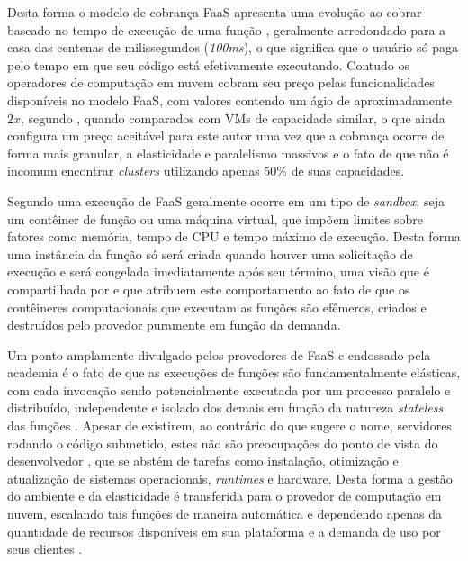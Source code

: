 \documentclass[english,brazilian]{UNISINOSmonografia} %
\begin{document}
Desta forma o modelo de cobrança FaaS apresenta uma evolução  ao cobrar baseado no tempo de execução de uma função \cite{FowlerServerless, Wang2018}, geralmente arredondado para a casa das centenas de milissegundos (\textit{100ms}), o que significa que o usuário só paga pelo tempo em que seu código está efetivamente executando.
Contudo os operadores de computação em nuvem cobram seu preço pelas funcionalidades disponíveis no modelo FaaS, com valores contendo um ágio de aproximadamente $2x$, segundo , quando comparados com VMs de capacidade similar, o que ainda configura um preço aceitável para este autor uma vez que a cobrança ocorre de forma mais granular, a elasticidade e paralelismo massivos e o fato de que não é incomum encontrar \textit{clusters} utilizando apenas 50\% de suas capacidades.



Segundo  uma execução de FaaS geralmente ocorre em um tipo de \textit{sandbox}, seja um contêiner de função ou uma máquina virtual, que impõem limites sobre fatores como memória, tempo de CPU e tempo máximo de execução.
Desta forma uma instância da função só será criada quando houver uma solicitação de execução e será congelada imediatamente após seu término, uma visão que é compartilhada por  e que atribuem este comportamento ao fato de que os contêineres computacionais que executam as funções são efêmeros, criados e destruídos pelo provedor puramente em função da demanda.



Um ponto amplamente divulgado pelos provedores de FaaS e endossado pela academia é o fato de que as execuções de funções são fundamentalmente elásticas, com cada invocação sendo potencialmente executada por um processo paralelo e distribuído, independente e isolado dos demais em função da natureza \textit{stateless} das funções \cite{SpoialaServerless,Jonas2017,FowlerServerless,Jonas2017}.
Apesar de existirem, ao contrário do que sugere o nome, servidores rodando o código submetido, estes não são preocupações do ponto de vista do desenvolvedor \cite{SpoialaServerless}, que se abstém de tarefas como instalação, otimização e atualização de sistemas operacionais, \textit{runtimes} e hardware.
Desta forma a gestão do ambiente e da elasticidade é transferida para o provedor de computação em nuvem, escalando tais funções de maneira automática e dependendo apenas da quantidade de recursos disponíveis em sua plataforma e a demanda de uso por seus clientes \cite{BoweiHan}.
\end{document}
